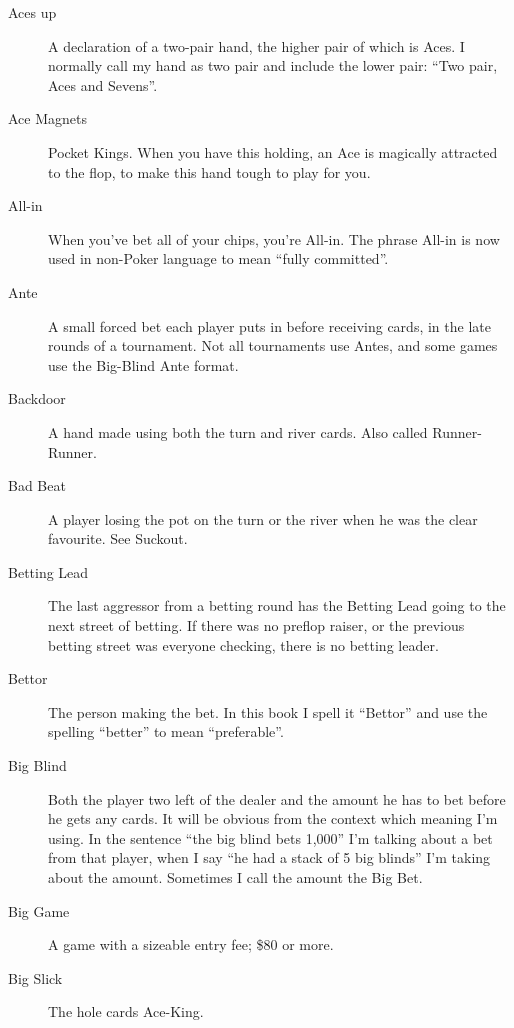 \begin{description}

\item[Aces up] A declaration of a two-pair hand, the higher pair of
which is Aces. I normally call my hand as two pair and include the
lower pair: ``Two pair, Aces and Sevens''.

\item[Ace Magnets] Pocket Kings. When you have this holding, an Ace is
magically attracted to the flop, to make this hand tough to play for
you.

\item[All-in] When you've bet all of your chips, you're All-in. The
phrase All-in is now used in non-Poker language to mean ``fully
committed''.

\item[Ante] A small forced bet each player puts in before receiving
cards, in the late rounds of a tournament. Not all tournaments use
Antes, and some games use the Big-Blind Ante format.

\item[Backdoor] A hand made using both the turn and river cards. Also
called Runner-Runner.

\item[Bad Beat] A player losing the pot on the turn or the river when
he was the clear favourite. See Suckout.

\item[Betting Lead] The last aggressor from a betting round has the
Betting Lead going to the next street of betting. If there was no
preflop raiser, or the previous betting street was everyone checking,
there is no betting leader.

\item[Bettor] The person making the bet. In this book I spell it ``Bettor''
and use the spelling ``better'' to mean ``preferable''.

\item[Big Blind] Both the player two left of the dealer and the amount
he has to bet before he gets any cards. It will be obvious from the
context which meaning I'm using. In the sentence ``the big blind bets
1,000'' I'm talking about a bet from that player, when I say ``he had
a stack of 5 big blinds'' I'm taking about the amount. Sometimes I
call the amount the Big Bet.

\item[Big Game] A game with a sizeable entry fee; \$80 or more.

\item[Big Slick] The hole cards Ace-King.


\end{description}
